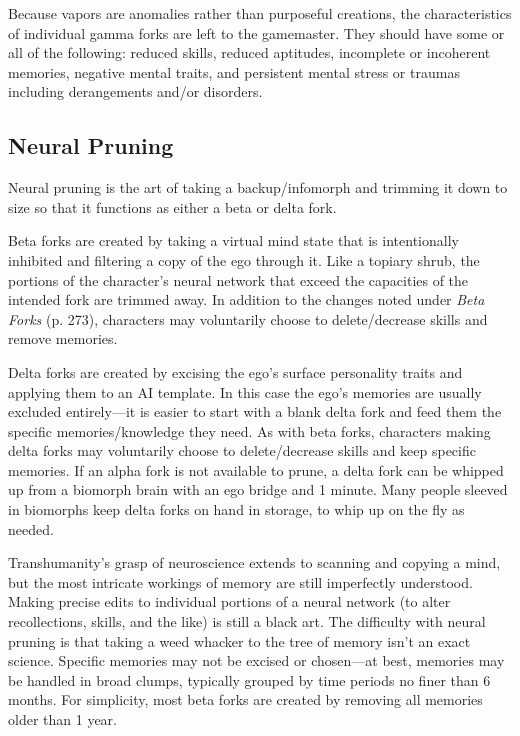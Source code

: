 Because vapors are anomalies rather than purposeful creations, the characteristics of individual gamma forks are left to the gamemaster. They should have some or all of the following: reduced skills, reduced aptitudes, incomplete or incoherent memories, negative mental traits, and persistent mental stress or traumas including derangements and/or disorders. 

\subsection{Neural Pruning} 

Neural pruning is the art of taking a backup/infomorph and trimming it down to size so that it functions as either a beta or delta fork. 

Beta forks are created by taking a virtual mind state that is intentionally inhibited and filtering a copy of the ego through it. Like a topiary shrub, the portions of the character's neural network that exceed the capacities of the intended fork are trimmed away. In addition to the changes noted under \textit{Beta Forks} (p. 273), characters may voluntarily choose to delete/decrease skills and remove memories. 

Delta forks are created by excising the ego's surface personality traits and applying them to an AI template. In this case the ego's memories are usually excluded entirely—it is easier to start with a blank delta fork and feed them the specific memories/knowledge they need. As with beta forks, characters making delta forks may voluntarily choose to delete/decrease skills and keep specific memories. If an alpha fork is not available to prune, a delta fork can be whipped up from a biomorph brain with an ego bridge and 1 minute. Many people sleeved in biomorphs keep delta forks on hand in storage, to whip up on the fly as needed. 

Transhumanity's grasp of neuroscience extends to scanning and copying a mind, but the most intricate workings of memory are still imperfectly understood. Making precise edits to individual portions of a neural network (to alter recollections, skills, and the like) is still a black art. The difficulty with neural pruning is that taking a weed whacker to the tree of memory isn't an exact science. Specific memories may not be excised or chosen—at best, memories may be handled in broad clumps, typically grouped by time periods no finer than 6 months. For simplicity, most beta forks are created by removing all memories older than 1 year. 

